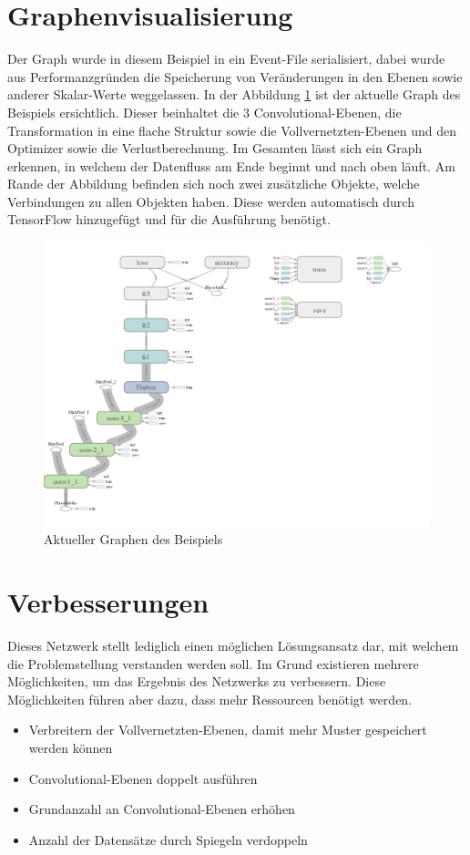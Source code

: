 \section{Graphenvisualisierung}

Der Graph wurde in diesem Beispiel in ein Event-File serialisiert, dabei wurde aus Performanzgründen die Speicherung von Veränderungen in den Ebenen sowie anderer Skalar-Werte weggelassen. 
In der Abbildung \ref{fig:graphDig} ist der aktuelle Graph des Beispiels ersichtlich. 
Dieser beinhaltet die $3$ Convolutional-Ebenen, die Transformation in eine flache Struktur sowie die Vollvernetzten-Ebenen und den Optimizer sowie die Verlustberechnung. 
Im Gesamten lässt sich ein Graph erkennen, in welchem der Datenfluss am Ende beginnt und nach oben läuft. 
Am Rande der Abbildung befinden sich noch zwei zusätzliche Objekte, welche Verbindungen zu allen Objekten haben. 
Diese werden automatisch durch TensorFlow hinzugefügt und für die Ausführung benötigt. 
\begin{figure}[ht!]
	\centering
	\includegraphics[scale=0.28]{images/graph-run.png}
	\caption{Aktueller Graphen des Beispiels}
	\label{fig:graphDig}
\end{figure}

\section{Verbesserungen}

Dieses Netzwerk stellt lediglich einen möglichen Lösungsansatz dar, mit welchem die Problemstellung verstanden werden soll. 
Im Grund existieren mehrere Möglichkeiten, um das Ergebnis des Netzwerks zu verbessern. 
Diese Möglichkeiten führen aber dazu, dass mehr Ressourcen benötigt werden. 
\begin{itemize}
	\item Verbreitern der Vollvernetzten-Ebenen, damit mehr Muster gespeichert werden können
	\item Convolutional-Ebenen doppelt ausführen 
	\item Grundanzahl an Convolutional-Ebenen erhöhen
	\item Anzahl der Datensätze durch Spiegeln verdoppeln
\end{itemize}






